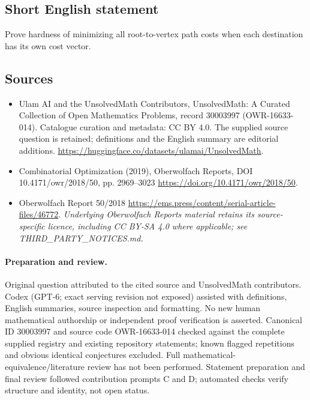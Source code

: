 \documentclass[11pt]{article}
\begin{document}
\subsection{Short English statement}
Prove hardness of minimizing all root-to-vertex path costs when each destination has its own cost vector.
\subsection{Sources}
\begin{itemize}
\item[\hypertarget{source:30003997:1}{S1}] Ulam AI and the UnsolvedMath Contributors, UnsolvedMath: A Curated Collection of Open Mathematics Problems, record 30003997 (OWR-16633-014). Catalogue curation and metadata: CC BY 4.0. The supplied source question is retained; definitions and the English summary are editorial additions.
\url{https://huggingface.co/datasets/ulamai/UnsolvedMath}.
\item[\hypertarget{source:30003997:2}{S2}] Combinatorial Optimization (2019), Oberwolfach Reports, DOI 10.4171/owr/2018/50, pp. 2969--3023
\url{https://doi.org/10.4171/owr/2018/50}.
\item[\hypertarget{source:30003997:3}{S3}] Oberwolfach Report 50/2018
\url{https://ems.press/content/serial-article-files/46772}.
\textit{Underlying Oberwolfach Reports material retains its source-specific licence, including CC BY-SA 4.0 where applicable; see THIRD\_PARTY\_NOTICES.md.}
\end{itemize}
\paragraph{Preparation and review.}
Original question attributed to the cited source and UnsolvedMath contributors. Codex (GPT-6; exact serving revision not exposed) assisted with definitions, English summaries, source inspection and formatting. No new human mathematical authorship or independent proof verification is asserted. Canonical ID 30003997 and source code OWR-16633-014 checked against the complete supplied registry and existing repository statements; known flagged repetitions and obvious identical conjectures excluded. Full mathematical-equivalence/literature review has not been performed. Statement preparation and final review followed contribution prompts C and D; automated checks verify structure and identity, not open status.
\label{end:30003997}
\end{document}
